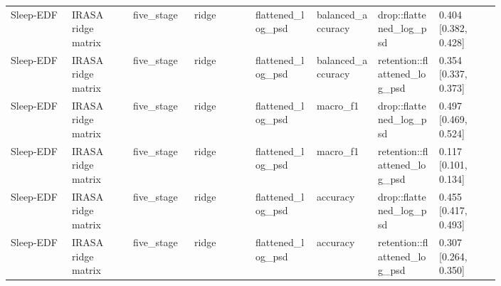 \begin{longtable}{p{0.10\linewidth}p{0.10\linewidth}p{0.10\linewidth}p{0.10\linewidth}p{0.10\linewidth}p{0.10\linewidth}p{0.10\linewidth}p{0.10\linewidth}}
Sleep-EDF & IRASA ridge matrix & five\_stage & ridge & flattened\_log\_psd & balanced\_accuracy & drop::flattened\_log\_psd & 0.404 [0.382, 0.428]\\
Sleep-EDF & IRASA ridge matrix & five\_stage & ridge & flattened\_log\_psd & balanced\_accuracy & retention::flattened\_log\_psd & 0.354 [0.337, 0.373]\\
Sleep-EDF & IRASA ridge matrix & five\_stage & ridge & flattened\_log\_psd & macro\_f1 & drop::flattened\_log\_psd & 0.497 [0.469, 0.524]\\
Sleep-EDF & IRASA ridge matrix & five\_stage & ridge & flattened\_log\_psd & macro\_f1 & retention::flattened\_log\_psd & 0.117 [0.101, 0.134]\\
Sleep-EDF & IRASA ridge matrix & five\_stage & ridge & flattened\_log\_psd & accuracy & drop::flattened\_log\_psd & 0.455 [0.417, 0.493]\\
Sleep-EDF & IRASA ridge matrix & five\_stage & ridge & flattened\_log\_psd & accuracy & retention::flattened\_log\_psd & 0.307 [0.264, 0.350]\\
\bottomrule
\end{longtable}
